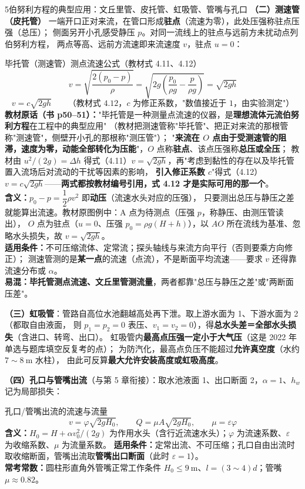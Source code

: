 \begin{kaodian}{5}{伯努利方程的典型应用：文丘里管、皮托管、虹吸管、管嘴与孔口}
\textbf{（二）测速管（皮托管）}
一端开口正对来流，在管口形成\textbf{驻点}（流速为零），此处压强称驻点压强（总压）；
侧面另开小孔感受静压 $p$。对同一流线上的驻点与远前方未扰动点列伯努利方程，
两点等高、远前方流速即来流速度 $v$，驻点 $u=0$：
\begin{gongshi}{毕托管（测速管）测点流速公式（教材式 4.11、4.12）}
\[ v=\sqrt{\frac{2(p_0-p)}{\rho}}=\sqrt{2g\!\left(\frac{p_0}{\rho g}-\frac{p}{\rho g}\right)}=\sqrt{2gh} \]
\[ v=c\sqrt{2gh}\qquad\text{（教材式 4.12，}c\text{ 为修正系数，"数值接近于 1，由实验测定"）} \]
\textbf{教材原话（书 p50--51）：}"毕托管是一种测量点流速的仪器，是\textbf{理想流体元流伯努利方程}在工程中的典型应用"
（教材把测速管称"毕托管"、把正对来流的那根管称"测速管"，侧壁开小孔的那根称"测压管"）；
"\textbf{来流在 $O$ 点由于受测速管的阻滞，速度为零，动能全部转化为压能}"，$O$ 点称\textbf{驻点}、该点压强称\textbf{总压或全压}；
教材由 $u^2/(2g)=\Delta h$ 得式（4.11）$v=\sqrt{2gh}$，再"考虑到黏性的存在以及毕托管置入流场后对流动的干扰等因素的影响，
\textbf{引入修正系数 $c$}"得式（4.12）$v=c\sqrt{2gh}$——\textbf{两式都按教材编号引用，式 4.12 才是实际可用的那一个}。\\
\textbf{含义：}$p_0-p=\dfrac{1}{2}\rho v^2$ 即\textbf{动压}（流速水头对应的压强），
只要测出总压与静压之差就能算出流速。教材原图例中：A 点为待测点（压强 $p$，称静压、由测压管读出），
$O$ 点为驻点（$u=0$、压强 $p_0=\rho g(H+h)$），以 $AO$ 所在流线为基准、忽略水头损失，故 $v=\sqrt{2gh}$。\\
\textbf{适用条件：}不可压缩流体、定常流；探头轴线与来流方向平行（否则要乘方向修正）；
测速管测的是\textbf{某一点}的流速（点流），不是断面平均流速——要求 $v$ 还得靠流速分布或 $\alpha$。\\
\textbf{易混：}\textbf{毕托管测点流速、文丘里管测流量}，两者都靠"总压与静压之差"或"两断面压差"。
\end{gongshi}

\textbf{（三）虹吸管}：管路自高位水池翻越高处再下泄。取上游水面为 1、下游水面为 2（都取自由液面，
则 $p_1=p_2=0$ 表压、$v_1=v_2=0$），得\textbf{总水头差＝全部水头损失}（含进口、转弯、出口）。
虹吸管内\textbf{最高点压强一定小于大气压}（这是 2022 年单选与题库填空反复考的点）；
为防汽化，最高点负压不能超过\textbf{允许真空度}（水约 $7\sim8\ \mathrm{m}$ 水柱），
由此可反算\textbf{最大允许安装高度或虹吸高度}。

\textbf{（四）孔口与管嘴出流}（与第 5 章衔接）：取水池液面 1、出口断面 2，$\alpha=1$、$h_w$ 记为局部损失：
\begin{gongshi}{孔口/管嘴出流的流速与流量}
\[ v=\varphi\sqrt{2gH_0},\qquad Q=\mu A\sqrt{2gH_0},\qquad \mu=\varepsilon\varphi \]
\textbf{含义：}$H_0=H+\alpha v_0^2/(2g)$ 为作用水头（含行近流速水头）；$\varphi$ 为流速系数、$\varepsilon$ 为收缩系数、$\mu$ 为流量系数。
\textbf{适用条件：}定常出流、不可压缩；孔口自由出流时取收缩断面，管嘴出流取\textbf{管嘴出口断面}（此时 $\varepsilon=1$）。\\
\textbf{常考常数：}圆柱形直角外管嘴正常工作条件 $H_0\le 9\ \mathrm{m}$、$l=(3\sim4)d$；管嘴 $\mu\approx0.82$。
\end{gongshi}


\end{kaodian}
